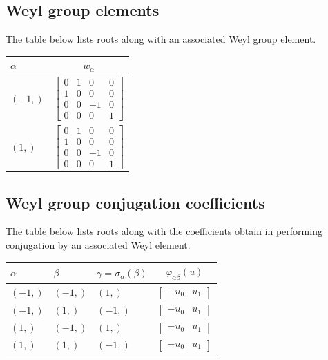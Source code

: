 \documentclass[11pt]{article}
\newcommand{\noi}{\noindent}
\theoremstyle{definition}
\begin{document}
\subsection{Weyl group elements}

\noi The table below lists roots along with an associated Weyl group element.

\bigskip

\noi \noindent \begin{longtable}{|l|c|}
    \hline
    $\alpha$ & $w_\alpha$ \\
    \hline
    \endhead
    $\left( -1,\right)$ & ${\left[\begin{matrix}0 & 1 & 0 & 0\\1 & 0 & 0 & 0\\0 & 0 & -1 & 0\\0 & 0 & 0 & 1\end{matrix}\right]}$ \\
    \hline
    $\left( 1,\right)$ & ${\left[\begin{matrix}0 & 1 & 0 & 0\\1 & 0 & 0 & 0\\0 & 0 & -1 & 0\\0 & 0 & 0 & 1\end{matrix}\right]}$ \\
    \hline
\end{longtable}


\subsection{Weyl group conjugation coefficients}

The table below lists roots along with the coefficients obtain in performing conjugation by an associated Weyl element.

\bigskip

\noi \noindent \begin{longtable}{|l|l|l|c|}
    \hline
    \textbf{$\alpha$} & \textbf{$\beta$} & \textbf{$\gamma = \sigma_{\alpha}(\beta)$} & $\varphi_{\alpha\beta}(u)$ \\
    \hline
    \endhead
    $\left( -1,\right)$ & $\left( -1,\right)$ & $\left( 1,\right)$ & $\left[\begin{matrix}- u_{0} & u_{1}\end{matrix}\right]$ \\
    \hline
    $\left( -1,\right)$ & $\left( 1,\right)$ & $\left( -1,\right)$ & $\left[\begin{matrix}- u_{0} & u_{1}\end{matrix}\right]$ \\
    \hline
    $\left( 1,\right)$ & $\left( -1,\right)$ & $\left( 1,\right)$ & $\left[\begin{matrix}- u_{0} & u_{1}\end{matrix}\right]$ \\
    \hline
    $\left( 1,\right)$ & $\left( 1,\right)$ & $\left( -1,\right)$ & $\left[\begin{matrix}- u_{0} & u_{1}\end{matrix}\right]$ \\
    \hline
\end{longtable}
\end{document}
